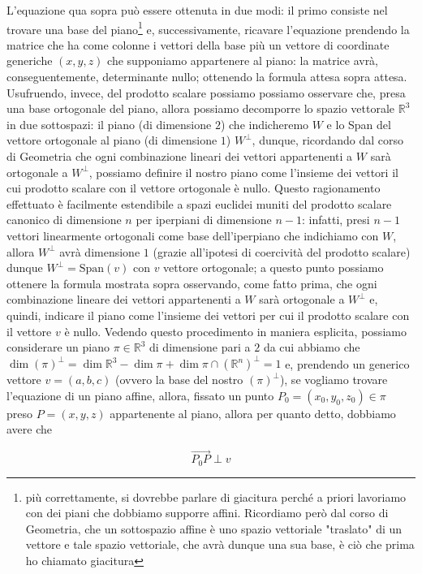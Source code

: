 L'equazione qua sopra può essere ottenuta in due modi: il primo consiste nel trovare una base del piano\footnote{più correttamente, si dovrebbe parlare di giacitura perché a priori lavoriamo con dei piani che dobbiamo supporre affini. Ricordiamo però dal corso di Geometria, che un sottospazio affine è uno spazio vettoriale "traslato" di un vettore e tale spazio vettoriale, che avrà dunque una sua base, è ciò che prima ho chiamato giacitura} e, successivamente, ricavare l'equazione prendendo la matrice che ha come colonne i vettori della base più un vettore di coordinate generiche $(x, y, z)$ che supponiamo appartenere al piano: la matrice avrà, conseguentemente, determinante nullo; ottenendo la formula attesa sopra attesa. Usufruendo, invece, del prodotto scalare possiamo possiamo osservare che, presa una base ortogonale del piano, allora possiamo decomporre lo spazio vettorale $\mathbb{R}^3$ in due sottospazi: il piano (di dimensione $2$) che indicheremo $W$ e lo Span del vettore ortogonale al piano (di dimensione $1$) $W^{\perp}$, dunque, ricordando dal corso di Geometria che ogni combinazione lineari dei vettori appartenenti a $W$ sarà ortogonale a $W^{\perp}$, possiamo definire il nostro piano come l'insieme dei vettori il cui prodotto scalare con il vettore ortogonale è nullo. Questo ragionamento effettuato è facilmente estendibile a spazi euclidei muniti del prodotto scalare canonico di dimensione $n$ per iperpiani di dimensione $n-1$: infatti, presi $n-1$ vettori linearmente ortogonali come base dell'iperpiano che indichiamo con $W$, allora $W^{\perp}$ avrà dimensione $1$ (grazie all'ipotesi di coercività del prodotto scalare) dunque $W^{\perp} = \text{Span}(v)$ con $v$ vettore ortogonale; a questo punto possiamo ottenere la formula mostrata sopra osservando, come fatto prima, che ogni combinazione lineare dei vettori appartenenti a $W$ sarà ortogonale a $W^{\perp}$ e, quindi, indicare il piano come l'insieme dei vettori per cui il prodotto scalare con il vettore $v$ è nullo. Vedendo questo procedimento in maniera esplicita, possiamo considerare un piano $\pi \in \mathbb{R}^3$ di dimensione pari a $2$ da cui abbiamo che $\dim{(\pi)^{\perp}} = \dim{\mathbb{R}^3} - \dim{\pi} + \dim{\pi \cap (\mathbb{R}^n)^{\perp}} = 1$ e, prendendo un generico vettore $v = (a, b, c)$ (ovvero la base del nostro $(\pi)^{\perp}$), se vogliamo trovare l'equazione di un piano affine, allora, fissato un punto $P_0 = (x_0, y_0, z_0) \in \pi$ preso $P = (x, y, z)$ appartenente al piano, allora per quanto detto, dobbiamo avere che

$$\vec{P_0P} \perp v$$

